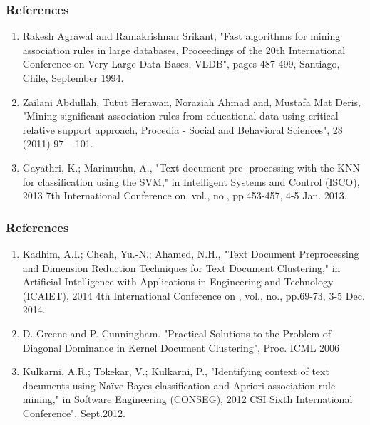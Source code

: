\documentclass{beamer}
\newcounter{saveenumi}
\newcommand{\seti}{\setcounter{saveenumi}{\value{enumi}}}
\newcommand{\conti}{\setcounter{enumi}{\value{saveenumi}}}
\begin{document}
	
		\begin{frame}
			\frametitle{References}
			\begin{enumerate}
			\item Rakesh Agrawal and Ramakrishnan Srikant, "Fast algorithms for mining association rules in large databases, Proceedings of the 20th International Conference on Very Large Data Bases, VLDB", pages 487-499, Santiago, Chile, September 1994.
			\item Zailani Abdullah, Tutut Herawan, Noraziah Ahmad and, Mustafa Mat Deris, "Mining significant association rules from educational data using critical relative support approach, Procedia - Social and Behavioral Sciences", 28 (2011) 97 – 101. 
			\item Gayathri, K.; Marimuthu, A., "Text document pre-
processing with the KNN for classification using the
SVM," in Intelligent Systems and Control (ISCO),
2013 7th International Conference on, vol., no.,
pp.453-457, 4-5 Jan. 2013.%
			\seti
			\end{enumerate}
			 
			 
		\end{frame}
		
		\begin{frame}
			\frametitle{References}
			\begin{enumerate}
			\conti
			\item Kadhim, A.I.; Cheah, Yu.-N.; Ahamed, N.H., "Text Document Preprocessing and Dimension Reduction
Techniques for Text Document Clustering," in
Artificial Intelligence with Applications in
Engineering and Technology (ICAIET), 2014 4th
International Conference on , vol., no., pp.69-73, 3-5
Dec. 2014.
			\item D. Greene and P. Cunningham. "Practical Solutions to the Problem of Diagonal Dominance in Kernel Document Clustering", Proc. ICML 2006
			\item Kulkarni, A.R.; Tokekar, V.; Kulkarni, P., "Identifying
context of text documents using Naïve Bayes
classification and Apriori association rule mining," in
Software Engineering (CONSEG), 2012 CSI Sixth International Conference", Sept.2012.
			\seti
			\end{enumerate}
			 
			 
		\end{frame}
\end{document}
